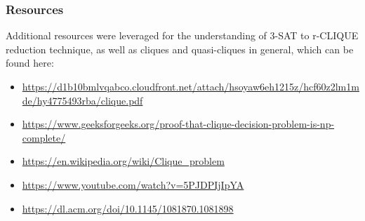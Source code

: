 \documentclass{beamer}
\begin{document}
\begin{frame}

  \frametitle{Resources}

  Additional resources were leveraged for the understanding of 3-SAT to r-CLIQUE reduction technique, as well as cliques and quasi-cliques in general, which can be found here:

  \begin{itemize}
    \item \url{https://d1b10bmlvqabco.cloudfront.net/attach/hsoyaw6eh1215z/hcf60z2lm1mde/hy4775493rba/clique.pdf}
    \item \url{https://www.geeksforgeeks.org/proof-that-clique-decision-problem-is-np-complete/}
    \item \url{https://en.wikipedia.org/wiki/Clique_problem}
    \item \url{https://www.youtube.com/watch?v=5PJDPIjIpYA}
    \item \url{https://dl.acm.org/doi/10.1145/1081870.1081898}
  \end{itemize}
  \vspace{2.5mm}

\end{frame}
\end{document}
